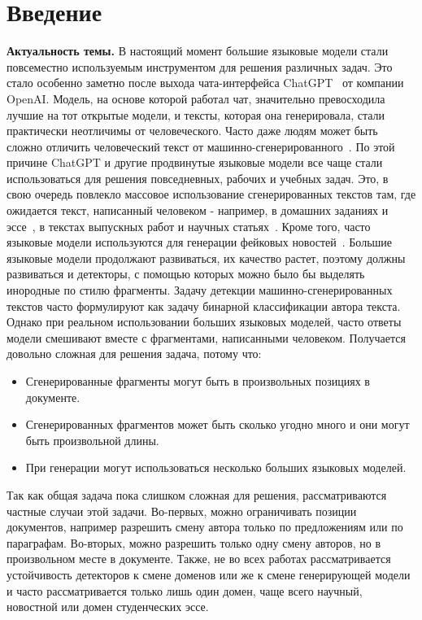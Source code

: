 \section{Введение}

\textbf{Актуальность темы.} В настоящий момент большие языковые модели стали повсеместно используемым инструментом для решения различных задач. Это стало особенно заметно после выхода чата-интерфейса ChatGPT~\cite{openai2023gpt4} от компании OpenAI. Модель, на основе которой работал чат, значительно превосходила лучшие на тот открытые модели, и тексты, которая она генерировала, стали практически неотличимы от человеческого. Часто даже людям может быть сложно отличить человеческий текст от машинно-сгенерированного~\cite{Dugan2022RealOF}. По этой причине ChatGPT и другие продвинутые языковые модели все чаще стали использоваться для решения повседневных, рабочих и учебных задач. Это, в свою очередь повлекло массовое использование сгенерированных текстов там, где ожидается текст, написанный человеком - например, в домашних заданиях и эссе~\cite{liu2023argugpt}, в текстах выпускных работ и научных статьях~\cite{ma2023ai, liang2024mapping}. Кроме того, часто языковые модели используются для генерации фейковых новостей~\cite{tweepfake2021, loth2024blessing}. Большие языковые модели продолжают развиваться, их качество растет, поэтому должны развиваться и детекторы, с помощью которых можно было бы выделять инородные по стилю фрагменты. Задачу детекции машинно-сгенерированных текстов часто формулируют как задачу бинарной классификации автора текста. Однако при реальном использовании больших языковых моделей, часто ответы модели смешивают вместе с фрагментами, написанными человеком. Получается довольно сложная для решения задача, потому что:
\begin{itemize}
    \item Сгенерированные фрагменты могут быть в произвольных позициях в документе.
    \item Сгенерированных фрагментов может быть сколько угодно много и они могут быть произвольной длины.
    \item При генерации могут использоваться несколько больших языковых моделей.
\end{itemize}
Так как общая задача пока слишком сложная для решения, рассматриваются частные случаи этой задачи. Во-первых, можно ограничивать позиции документов, например разрешить смену автора только по предложениям или по параграфам. Во-вторых, можно разрешить только одну смену авторов, но в произвольном месте в документе. Также, не во всех работах рассматривается устойчивость детекторов к смене доменов или же к смене генерирующей модели и часто рассматривается только лишь один домен, чаще всего научный, новостной или домен студенческих эссе. \\
